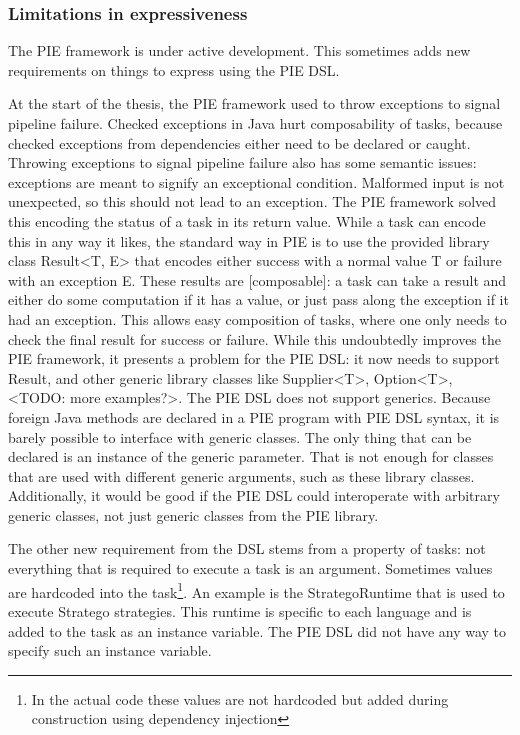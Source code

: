 \subsubsection{Limitations in expressiveness}
\label{subsubsec:problem_analysis__problems__expressiveness}

The \ac{PIE} framework is under active development.
This sometimes adds new requirements on things to express using the \ac{PIE} \ac{DSL}.

At the start of the thesis, the \ac{PIE} framework used to throw exceptions to signal pipeline failure.
Checked exceptions in Java hurt composability of tasks, because checked exceptions from dependencies either need to be declared or caught.
Throwing exceptions to signal pipeline failure also has some semantic issues: exceptions are meant to signify an exceptional condition.
Malformed input is not unexpected, so this should not lead to an exception.
The \ac{PIE} framework solved this encoding the status of a task in its return value.
While a task can encode this in any way it likes, the standard way in \ac{PIE} is to use the provided library class Result<T, E> that encodes either success with a normal value T or failure with an exception E.
These results are [composable]: a task can take a result and either do some computation if it has a value, or just pass along the exception if it had an exception.
This allows easy composition of tasks, where one only needs to check the final result for success or failure.
While this undoubtedly improves the \ac{PIE} framework, it presents a problem for the \ac{PIE} \ac{DSL}: it now needs to support Result, and other generic library classes like Supplier<T>, Option<T>, <TODO: more examples?>.
The \ac{PIE} \ac{DSL} does not support generics.
Because foreign Java methods are declared in a \ac{PIE} program with \ac{PIE} \ac{DSL} syntax, it is barely possible to interface with generic classes.
The only thing that can be declared is an instance of the generic parameter. That is not enough for classes that are used with different generic arguments, such as these library classes.
Additionally, it would be good if the \ac{PIE} \ac{DSL} could interoperate with arbitrary generic classes, not just generic classes from the \ac{PIE} library.

The other new requirement from the \ac{DSL} stems from a property of tasks: not everything that is required to execute a task is an argument.
Sometimes values are hardcoded into the task\footnote{In the actual code these values are not hardcoded but added during  construction using dependency injection}.
An example is the StrategoRuntime that is used to execute Stratego strategies.
This runtime is specific to each language and is added to the task as an instance variable.
The \ac{PIE} \ac{DSL} did not have any way to specify such an instance variable.

